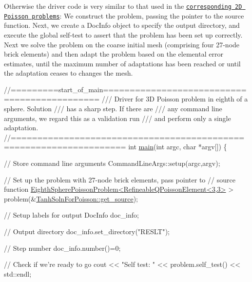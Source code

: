 Otherwise the driver code is very similar to that used in the \href{../../../poisson/fish_poisson/html/index.html}{\tt corresponding 2D Poisson problems}\+: We construct the problem, passing the pointer to the source function. Next, we create a {\ttfamily Doc\+Info} object to specify the output directory, and execute the global self-\/test to assert that the problem has been set up correctly. Next we solve the problem on the coarse initial mesh (comprising four 27-\/node brick elements) and then adapt the problem based on the elemental error estimates, until the maximum number of adaptations has been reached or until the adaptation ceases to changes the mesh.

 
\begin{DoxyCodeInclude}
\textcolor{comment}{//=========start\_of\_main=============================================}
\textcolor{comment}{/// Driver for 3D Poisson problem in eighth of a sphere. Solution }
\textcolor{comment}{}\textcolor{comment}{/// has a sharp step. If there are}
\textcolor{comment}{}\textcolor{comment}{/// any command line arguments, we regard this as a validation run}
\textcolor{comment}{}\textcolor{comment}{/// and perform only a single adaptation.}
\textcolor{comment}{}\textcolor{comment}{//===================================================================}
\textcolor{keywordtype}{int} \hyperlink{eighth__sphere__poisson_8cc_a0ddf1224851353fc92bfbff6f499fa97}{main}(\textcolor{keywordtype}{int} argc, \textcolor{keywordtype}{char} *argv[]) 
\{ 

 \textcolor{comment}{// Store command line arguments}
 CommandLineArgs::setup(argc,argv);

 \textcolor{comment}{// Set up the problem with 27-node brick elements, pass pointer to }
 \textcolor{comment}{// source function}
 \hyperlink{classEighthSpherePoissonProblem}{EighthSpherePoissonProblem<RefineableQPoissonElement<3,3>}
       >
  problem(&\hyperlink{namespaceTanhSolnForPoisson_ae1b9d6789ff301e3d63a4e292213036c}{TanhSolnForPoisson::get\_source});

 \textcolor{comment}{// Setup labels for output}
  DocInfo doc\_info;

 \textcolor{comment}{// Output directory}
 doc\_info.set\_directory(\textcolor{stringliteral}{"RESLT"});

 \textcolor{comment}{// Step number}
 doc\_info.number()=0;

 \textcolor{comment}{// Check if we're ready to go}
 cout << \textcolor{stringliteral}{"Self test: "} << problem.self\_test() << std::endl;
 

\end{DoxyCodeInclude}
